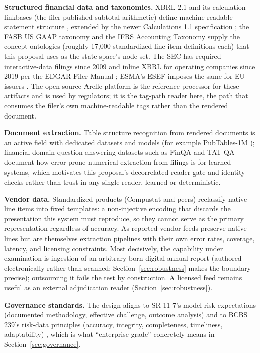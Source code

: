 \documentclass[11pt]{article}
\newcommand{\lead}[2]{\par\addvspace{5pt}\textbf{\textcolor{#1}{#2}}}
\begin{document}
\lead{navytwo}{Structured financial data and taxonomies.} XBRL 2.1 and its calculation linkbases (the filer-published subtotal arithmetic) define machine-readable statement structure \cite{xbrl21}, extended by the newer Calculations 1.1 specification \cite{calc11}; the FASB US GAAP taxonomy \cite{usgaap} and the IFRS Accounting Taxonomy \cite{ifrstax} supply the concept ontologies (roughly 17{,}000 standardized line-item definitions each) that this proposal uses as the state space's node set. The SEC has required interactive-data filings since 2009 \cite{sec33_9002} and inline XBRL for operating companies since 2019 per the EDGAR Filer Manual \cite{efm}; ESMA's ESEF imposes the same for EU issuers \cite{esef}. The open-source Arelle platform \cite{arelle} is the reference processor for these artifacts and is used by regulators; it is the tag-path reader here, the path that consumes the filer's own machine-readable tags rather than the rendered document.

\lead{navytwo}{Document extraction.} Table structure recognition from rendered documents is an active field with dedicated datasets and models (for example PubTables-1M \cite{pubtables}); financial-domain question answering datasets such as FinQA \cite{finqa} and TAT-QA \cite{tatqa} document how error-prone numerical extraction from filings is for learned systems, which motivates this proposal's decorrelated-reader gate and identity checks rather than trust in any single reader, learned or deterministic.

\lead{navytwo}{Vendor data.} Standardized products (Compustat and peers) reclassify native line items into fixed templates: a non-injective encoding that discards the presentation this system must reproduce, so they cannot serve as the primary representation regardless of accuracy. As-reported vendor feeds preserve native lines but are themselves extraction pipelines with their own error rates, coverage, latency, and licensing constraints. Most decisively, the capability under examination is ingestion of an arbitrary born-digital annual report (authored electronically rather than scanned; Section~\ref{sec:robustness} makes the boundary precise); outsourcing it fails the test by construction. A licensed feed remains useful as an external adjudication reader (Section~\ref{sec:robustness}).

\lead{navytwo}{Governance standards.} The design aligns to SR 11-7's model-risk expectations (documented methodology, effective challenge, outcome analysis) \cite{sr117} and to BCBS 239's risk-data principles (accuracy, integrity, completeness, timeliness, adaptability) \cite{bcbs239}, which is what ``enterprise-grade'' concretely means in Section~\ref{sec:governance}.
\end{document}
